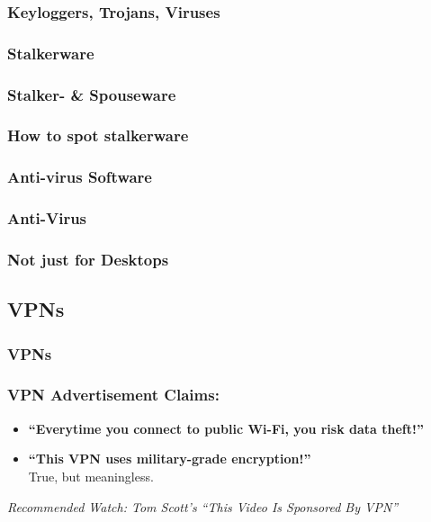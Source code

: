 \documentclass[aspectratio=169,dvipsnames]{beamer}
\begin{document}
\begin{frame}
\frametitle{Keyloggers, Trojans, Viruses}
\end{frame}

\subsubsection{Stalkerware}

\begin{frame}
\frametitle{Stalker- \& Spouseware}
\end{frame}

\begin{frame}
\frametitle{How to spot stalkerware}
\end{frame}

\subsubsection{Anti-virus Software}

\begin{frame}
\frametitle{Anti-Virus}
\end{frame}

\begin{frame}
\frametitle{Not just for Desktops}
\end{frame}

\subsection{VPNs}

\begin{frame}
\frametitle{VPNs}
\end{frame}

\begin{frame}
\frametitle{VPN Advertisement Claims:}

\begin{itemize}
\item \textbf{``Everytime you connect to public Wi-Fi, you risk data theft!''}
\pause \item \textbf{``This VPN uses military-grade encryption!''}\\
True, but meaningless.
\end{itemize}


\pause
\begin{center}
\emph{Recommended Watch: Tom Scott's ``This Video Is Sponsored By VPN''}
\end{center}
\end{frame}
\end{document}
